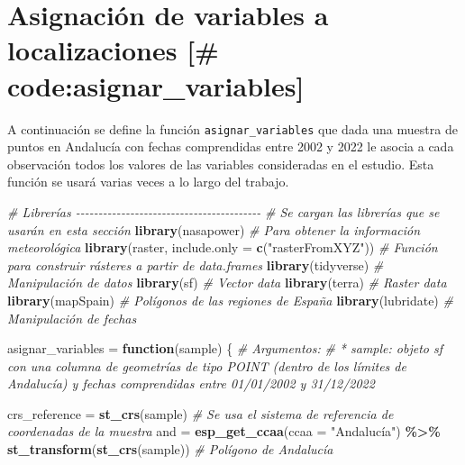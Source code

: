 \documentclass[12pt,a4paper,]{book}
\newenvironment{Shaded}{\begin{snugshade}}{\end{snugshade}}
\newcommand{\AttributeTok}[1]{\textcolor[rgb]{0.13,0.29,0.53}{#1}}
\newcommand{\CommentTok}[1]{\textcolor[rgb]{0.56,0.35,0.01}{\textit{#1}}}
\newcommand{\ControlFlowTok}[1]{\textcolor[rgb]{0.13,0.29,0.53}{\textbf{#1}}}
\newcommand{\FunctionTok}[1]{\textcolor[rgb]{0.13,0.29,0.53}{\textbf{#1}}}
\newcommand{\NormalTok}[1]{#1}
\newcommand{\OtherTok}[1]{\textcolor[rgb]{0.56,0.35,0.01}{#1}}
\newcommand{\SpecialCharTok}[1]{\textcolor[rgb]{0.81,0.36,0.00}{\textbf{#1}}}
\newcommand{\StringTok}[1]{\textcolor[rgb]{0.31,0.60,0.02}{#1}}
\numberwithin{dummy}{section}
\theoremstyle{ocrenumbox}
\theoremstyle{blacknumex}
\theoremstyle{blacknumbox}
\theoremstyle{ocrenum}
\theoremstyle{ocrenum}
\begin{document}
\hypertarget{asignaciuxf3n-de-variables-a-localizaciones-codeasignar_variables}{%
\section{Asignación de variables a localizaciones {[}\#
code:asignar\_variables{]}}\label{asignaciuxf3n-de-variables-a-localizaciones-codeasignar_variables}}

A continuación se define la función \texttt{asignar\_variables} que dada
una muestra de puntos en Andalucía con fechas comprendidas entre 2002 y
2022 le asocia a cada observación todos los valores de las variables
consideradas en el estudio. Esta función se usará varias veces a lo
largo del trabajo.

\begin{Shaded}
\begin{Highlighting}[]
\CommentTok{\# Librerías {-}{-}{-}{-}{-}{-}{-}{-}{-}{-}{-}{-}{-}{-}{-}{-}{-}{-}{-}{-}{-}{-}{-}{-}{-}{-}{-}{-}{-}{-}{-}{-}{-}{-}{-}{-}{-}{-}{-}{-}{-}}
\CommentTok{\# Se cargan las librerías que se usarán en esta sección}
\FunctionTok{library}\NormalTok{(nasapower) }\CommentTok{\# Para obtener la información meteorológica}
\FunctionTok{library}\NormalTok{(raster, }\AttributeTok{include.only =} \FunctionTok{c}\NormalTok{(}\StringTok{"rasterFromXYZ"}\NormalTok{))  }\CommentTok{\# Función para construir rásteres a partir de data.frames}
\FunctionTok{library}\NormalTok{(tidyverse) }\CommentTok{\# Manipulación de datos}
\FunctionTok{library}\NormalTok{(sf) }\CommentTok{\# Vector data}
\FunctionTok{library}\NormalTok{(terra) }\CommentTok{\# Raster data}
\FunctionTok{library}\NormalTok{(mapSpain) }\CommentTok{\# Polígonos de las regiones de España}
\FunctionTok{library}\NormalTok{(lubridate) }\CommentTok{\# Manipulación de fechas}

\NormalTok{asignar\_variables }\OtherTok{=} \ControlFlowTok{function}\NormalTok{(sample) \{}
  \CommentTok{\# Argumentos:}
  \CommentTok{\# * sample: objeto sf con una columna de geometrías de tipo POINT (dentro de los límites de Andalucía) y fechas comprendidas entre 01/01/2002 y 31/12/2022 }

  
\NormalTok{  crs\_reference }\OtherTok{=} \FunctionTok{st\_crs}\NormalTok{(sample) }\CommentTok{\# Se usa el sistema de referencia de coordenadas de la muestra}
\NormalTok{  and }\OtherTok{=} \FunctionTok{esp\_get\_ccaa}\NormalTok{(}\AttributeTok{ccaa =} \StringTok{"Andalucía"}\NormalTok{) }\SpecialCharTok{\%\textgreater{}\%} \FunctionTok{st\_transform}\NormalTok{(}\FunctionTok{st\_crs}\NormalTok{(sample)) }\CommentTok{\# Polígono de Andalucía}
  

\end{Highlighting}
\end{Shaded}
\end{document}
